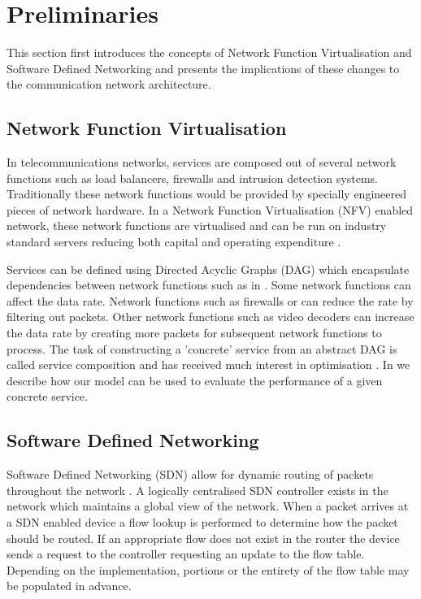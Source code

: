 
\section{Preliminaries}
\label{sec:preliminaries}
This section first introduces the concepts of Network Function Virtualisation and Software Defined Networking and presents the implications of these changes to the communication network architecture.

\subsection{Network Function Virtualisation}
In telecommunications networks, services are composed out of several network functions such as load balancers, firewalls and intrusion detection systems. Traditionally these network functions would be provided by specially engineered pieces of network hardware. In a Network Function Virtualisation (NFV) enabled network, these network functions are virtualised and can be run on industry standard servers reducing both capital and operating expenditure \cite{}.

Services can be defined using Directed Acyclic Graphs (DAG) which encapsulate dependencies between network functions such as in . Some network functions can affect the data rate. Network functions such as firewalls or can reduce the rate by filtering out packets. Other network functions such as video decoders can increase the data rate by creating more packets for subsequent network functions to process. The task of constructing a 'concrete' service from an abstract DAG is called service composition and has received much interest in optimisation \cite{EXAMPLES}. In  we describe how our model can be used to evaluate the performance of a given concrete service.

\subsection{Software Defined Networking}
Software Defined Networking (SDN) allow for dynamic routing of packets throughout the network \cite{}. A logically centralised SDN controller exists in the network which maintains a global view of the network. When a packet arrives at a SDN enabled device a flow lookup is performed to determine how the packet should be routed. If an appropriate flow does not exist in the router the device sends a request to the controller requesting an update to the flow table. Depending on the implementation, portions or the entirety of the flow table may be populated in advance.

